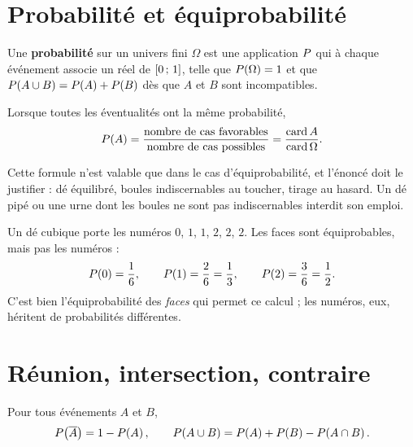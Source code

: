 \section{Probabilité et équiprobabilité}

\begin{definition}
Une \textbf{probabilité} sur un univers fini $\Omega$ est une application
$P$ qui à chaque événement associe un réel de $\left[0\,;\,1\right]$, telle
que $P\!\left(\Omega\right) = 1$ et que $P\!\left(A \cup B\right) = P\!\left(A\right)+P\!\left(B\right)$ dès
que $A$ et $B$ sont incompatibles.
\end{definition}

\begin{propriete}
Lorsque toutes les éventualités ont la même probabilité,
\[
  P\!\left(A\right) = \frac{\text{nombre de cas favorables}}{
  \text{nombre de cas possibles}} = \frac{\operatorname{card}A}{
  \operatorname{card}\Omega}.
\]
\end{propriete}

\begin{avertissement}
Cette formule n'est valable que dans le cas d'équiprobabilité, et l'énoncé
doit le justifier : dé équilibré, boules indiscernables au toucher, tirage au
hasard. Un dé pipé ou une urne dont les boules ne sont pas indiscernables
interdit son emploi.
\end{avertissement}

\begin{exemple}[un dé déséquilibré]
Un dé cubique porte les numéros $0$, $1$, $1$, $2$, $2$, $2$. Les faces sont
équiprobables, mais pas les numéros :
\[
  P\!\left(0\right) = \frac16, \qquad P\!\left(1\right) = \frac26 = \frac13,
  \qquad P\!\left(2\right) = \frac36 = \frac12 .
\]
C'est bien l'équiprobabilité des \emph{faces} qui permet ce calcul ; les
numéros, eux, héritent de probabilités différentes.
\end{exemple}

\section{Réunion, intersection, contraire}

\begin{propriete}
Pour tous événements $A$ et $B$,
\[
  P\!\left(\overline{A}\right) = 1-P\!\left(A\right),
  \qquad
  P\!\left(A \cup B\right) = P\!\left(A\right)+P\!\left(B\right)-P\!\left(A \cap B\right).
\]
\end{propriete}

